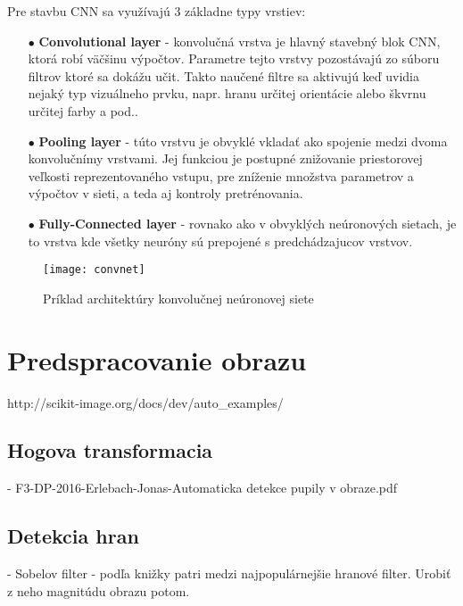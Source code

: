 Pre stavbu CNN sa využívajú 3 základne typy vrstiev:
\begin{enumerate}
    \item[$\bullet$] \textbf{Convolutional layer} - konvolučná vrstva je hlavný stavebný blok CNN, ktorá robí väčšinu výpočtov.
    Parametre tejto vrstvy pozostávajú zo súboru filtrov ktoré sa dokážu učit.
    Takto naučené filtre sa aktivujú keď uvidia nejaký typ vizuálneho prvku, napr. hranu určitej orientácie alebo škvrnu určitej farby a pod..
    \item[$\bullet$] \textbf{Pooling layer} - túto vrstvu je obvyklé vkladať ako spojenie medzi dvoma konvolučnímy vrstvami.
    Jej funkciou je postupné znižovanie priestorovej veľkosti reprezentovaného vstupu, pre zníženie množstva parametrov a výpočtov v sieti, a teda aj kontroly pretrénovania.
    \item[$\bullet$] \textbf{Fully-Connected layer} - rovnako ako v obvyklých neúronových sietach, je to vrstva kde všetky neuróny sú prepojené s predchádzajucov vrstvov.
\end{enumerate}

\begin{figure}[H]
	\centering
	\texttt{[image: convnet]}
	\caption{Príklad architektúry konvolučnej neúronovej siete \cite{odkaz:CNNArchitecture}}
	\label{pic:NNExample}
\end{figure}

\section{Predspracovanie obrazu}
http://scikit-image.org/docs/dev/auto\_examples/


\subsection{Hogova transformacia}
- F3-DP-2016-Erlebach-Jonas-Automaticka detekce pupily v obraze.pdf

\subsection{Detekcia hran}

- Sobelov filter - podľa knižky patri medzi najpopulárnejšie hranové filter.
Urobiť z neho magnitúdu obrazu potom.

